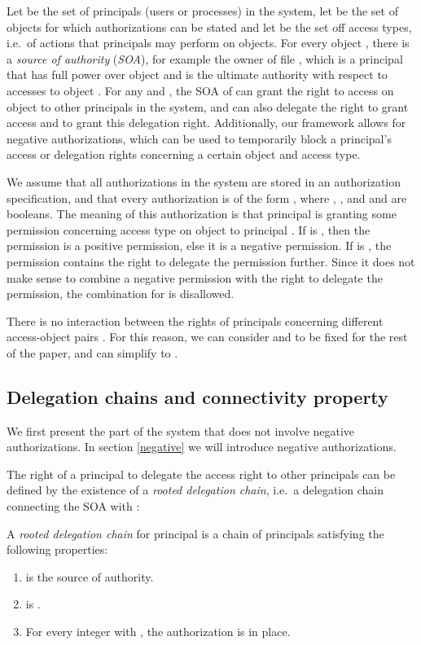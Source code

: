 \documentclass[runningheads]{llncs}
\begin{document}
Let  be the set of principals (users or processes) in the system, let  be the set of objects for which authorizations can be stated and let  be the set off access types, i.e.\ of actions that principals may perform on objects. For every object , there is a \emph{source of authority} (\emph{SOA}), for example the owner of file , which is a principal that has full power over object  and is the ultimate authority with respect to accesses to object . For any  and , the SOA of  can grant the right to access  on object  to other principals in the system, and can also delegate the right to grant access and to grant this delegation right. Additionally, our framework allows for negative authorizations, which can be used to temporarily block a principal's access or delegation rights concerning a certain object and access type. 

We assume that all authorizations in the system are stored in an authorization specification, and that every authorization is of the form , where , ,  and  and  are booleans. The meaning of this authorization is that principal  is granting some permission concerning access type  on object  to principal . If  is , then the permission is a positive permission, else it is a negative permission. If  is , the permission contains the right to delegate the permission further. Since it does not make sense to combine a negative permission with the right to delegate the permission, the combination  for  is disallowed.

There is no interaction between the rights of principals concerning different access-object pairs . For this reason, we can consider  and  to be fixed for the rest of the paper, and can simplify  to .

\subsection{Delegation chains and connectivity property}
\label{delegation}
We first present the part of the system that does not involve negative authorizations. In section \ref{negative} we will introduce negative authorizations.

The right of a principal  to delegate the access right to other principals can be defined by the existence of a \emph{rooted delegation chain}, i.e.\ a delegation chain connecting the SOA with :

\begin{definition}
 A \emph{rooted delegation chain} for principal  is a chain  of principals satisfying the following properties: 
 \begin{enumerate}
  \item  is the source of authority.
  \item  is .
  \item For every integer  with , the authorization  is in place.
 \end{enumerate}
\end{definition}
\end{document}
